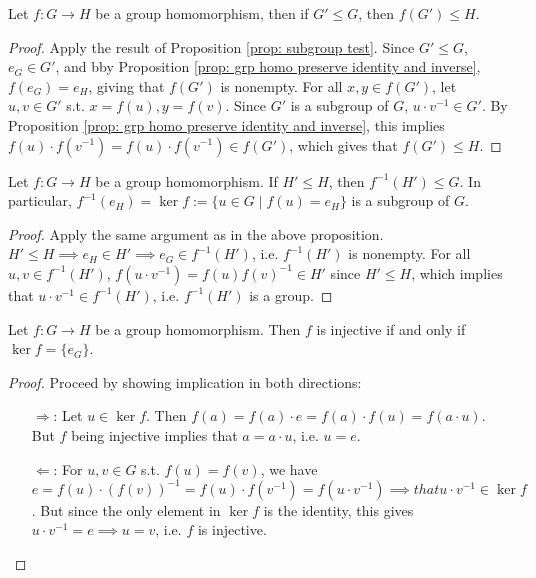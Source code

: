 \documentclass{article}
\begin{document}
\begin{proposition}
    Let $f: G \to H$ be a group homomorphism, then if $G' \leq G$, then $f(G') \leq H$.
\end{proposition}

\begin{proof}
    Apply the result of Proposition \ref{prop: subgroup test}. Since $G' \leq G$, $e_G \in G'$, and bby Proposition \ref{prop: grp homo preserve identity and inverse}, $f(e_G) = e_H$, giving that $f(G')$ is nonempty. For all $x, y \in f(G')$, let $u, v \in G'$ s.t. $x = f(u), y = f(v)$. Since $G'$ is a subgroup of $G$, $u\cdot v^{-1} \in G'$. By Proposition \ref{prop: grp homo preserve identity and inverse}, this implies $f(u) \cdot f(v^{-1}) = f(u) \cdot f(v^{-1}) \in f(G')$, which gives that $f(G') \leq H$.
\end{proof}

\begin{proposition}
    Let $f: G \to H$ be a group homomorphism. If $H' \leq H$, then $f^{-1} (H') \leq G$. In particular, $f^{-1}(e_H) = \ker f := \{u \in G \mid f(u) = e_H\}$ is a subgroup of $G$.
\end{proposition}

\begin{proof}
    Apply the same argument as in the above proposition. $H' \leq H \implies e_H \in H' \implies e_G \in f^{-1}(H')$, i.e. $f^{-1}(H')$ is nonempty. For all $u, v \in f^{-1}(H')$, $f(u\cdot v^{-1}) = f(u) f(v)^{-1} \in H'$ since $H' \leq H$, which implies that $u \cdot v^{-1} \in f^{-1}(H')$, i.e. $f^{-1}(H')$ is a group. 
\end{proof}

\begin{proposition}
    Let $f: G \to H$ be a group homomorphism. Then $f$ is injective if and only if $\ker f = \{e_G\}$.
\end{proposition}

\begin{proof}
    Proceed by showing implication in both directions:
    \begin{enumerate}
        \item[$\Rightarrow$:] Let $u \in \ker f$. Then $f(a) = f(a) \cdot e = f(a) \cdot f(u) = f(a \cdot u)$. But $f$ being injective implies that $a = a\cdot u$, i.e. $u = e$.
        \item[$\Leftarrow$:] For $u, v \in G$ s.t. $f(u) = f(v)$, we have $e = f(u) \cdot (f(v))^{-1} = f(u) \cdot f(v^{-1}) = f(u \cdot v^{-1}) \implies that u \cdot v^{-1} \in \ker f$. But since the only element in $\ker f$ is the identity, this gives $u \cdot v^{-1} = e \implies u = v$, i.e. $f$ is injective.
    \end{enumerate}
\end{proof}
\end{document}
